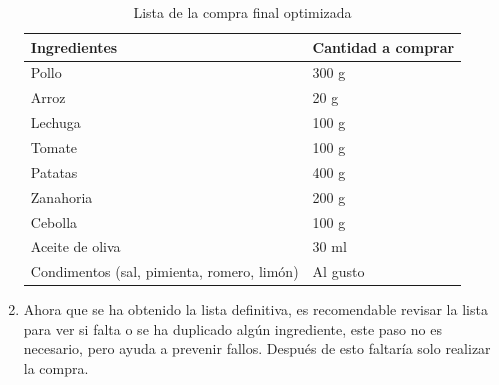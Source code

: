 \documentclass[12pt,a4paper]{report} %
\begin{document}
\begin{enumerate}
		\begin{table}[H]
			\centering			
			\label{fig:TablaIngrFinal}
			\caption{Lista de la compra final optimizada}
			\begin{tabular}{|p{5cm}|p{3cm}|}
				\hline
				\textbf{Ingredientes} & \textbf{Cantidad a comprar} \\ \hline
				Pollo & 300 g \\ \hline
				Arroz & 20 g \\ \hline
				Lechuga & 100 g \\ \hline
				Tomate & 100 g \\ \hline
				Patatas & 400 g \\ \hline
				Zanahoria & 200 g \\ \hline
				Cebolla & 100 g \\ \hline
				Aceite de oliva & 30 ml \\ \hline
				Condimentos (sal, pimienta, romero, limón) & Al gusto \\ \hline
			\end{tabular}
		\end{table}
		
		
		
		\item Ahora que se ha obtenido la lista definitiva, es recomendable revisar la lista para ver si falta o se ha duplicado algún ingrediente, este paso no es necesario, pero ayuda a prevenir fallos. Después de esto faltaría solo realizar la compra.
	\end{enumerate}
\end{document}
